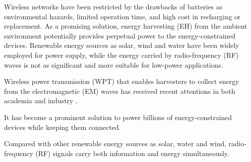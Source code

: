 Wireless networks have been restricted by the drawbacks of batteries as environmental hazards, limited operation time, and high cost in recharging or replacement. As a promising solution, energy harvesting (EH) from the ambient environment potentially provides perpetual power to the energy-constrained devices. Renewable energy sources as solar, wind and water have been widely employed for power supply, while the energy carried by radio-frequency (RF) waves is not as significant and more suitable for low-power applications. 


Wireless power transmission (WPT) that enables harvesters to collect energy from the electromagnetic (EM) waves has received recent attentions in both academia and industry \cite{R.Varshney2008,Grover2010,Zhang2013,Hui2014,Krikidis2014,Valenta2014,Boshkovska2015,Ding2015,Costanzo2016,Clerckx2018a}.



 It has become a prominent solution to power billions of energy-constrained devices while keeping them connected.





Compared with other renewable energy sources as solar, water and wind, radio-frequency (RF) signals carry both information and energy simultaneously. 
